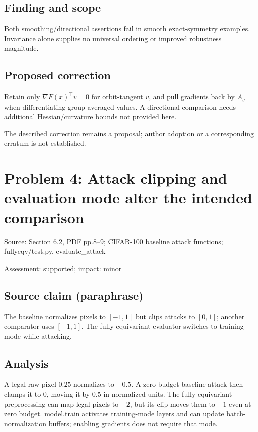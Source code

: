 \documentclass[11pt]{article}
\begin{document}
\subsection*{Finding and scope}

Both smoothing/directional assertions fail in smooth exact-symmetry examples. Invariance alone supplies no universal ordering or improved robustness magnitude.

\subsection*{Proposed correction}

Retain only \(\nabla F(x)^\top v=0\) for orbit-tangent \(v\), and pull gradients back by \(A_g^\top\) when differentiating group-averaged values. A directional comparison needs additional Hessian/curvature bounds not provided here.

The described correction remains a proposal; author adoption or a corresponding erratum is not established.

\section*{Problem 4: Attack clipping and evaluation mode alter the intended comparison}

Source: Section 6.2, PDF pp.8–9; CIFAR-100 baseline attack functions; fullyeqv/test.py, evaluate\_attack

Assessment: supported; impact: minor

\subsection*{Source claim (paraphrase)}

The baseline normalizes pixels to \([-1,1]\) but clips attacks to \([0,1]\); another comparator uses \([-1,1]\). The fully equivariant evaluator switches to training mode while attacking.

\subsection*{Analysis}

A legal raw pixel \(0.25\) normalizes to \(-0.5\). A zero-budget baseline attack then clamps it to \(0\), moving it by \(0.5\) in normalized units. The fully equivariant preprocessing can map legal pixels to \(-2\), but its clip moves them to \(-1\) even at zero budget. model.train activates training-mode layers and can update batch-normalization buffers; enabling gradients does not require that mode.
\end{document}
